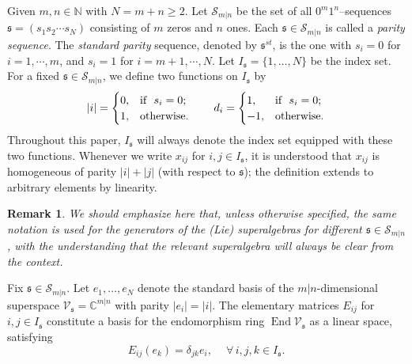 \documentclass[a4paper,12pt]{article}
\newtheorem{rema}[theo]{Remark}
\numberwithin{equation}{section}
\begin{document}
Given $m,n\in\mathbb{N}$ with $N=m+n\geqslant 2$. Let $\mathcal{S}_{m|n}$ be the set of all $0^{m}1^{n}$--sequences $\mathfrak{s}=(s_1s_2\cdots s_N)$ consisting of $m$ zeros and $n$ ones. Each $\mathfrak{s}\in\mathcal{S}_{m|n}$ is called a \textit{parity sequence}. The \textit{standard parity} sequence, denoted by $\mathfrak{s}^{st}$, is the one with $s_i=0$ for $i=1,\cdots,m$, and $s_i=1$ for $i=m+1,\cdots,N$.
Let $I_{\mathfrak{s}}=\{1,\ldots,N\}$ be the index set. For a fixed $\mathfrak{s}\in\mathcal{S}_{m|n}$, we define two functions on $I_{\mathfrak{s}}$ by
$$
 |i|=\begin{cases}
        0, &\text{if}~~s_i=0; \\
        1, &{\rm otherwise}.
    \end{cases}
    \qquad 
    d_i=\begin{cases}
        1, &\text{if}~~s_i=0; \\
        -1, &{\rm otherwise}.
    \end{cases}
$$
Throughout this paper, $I_{\mathfrak{s}}$ will always denote the index set equipped with these two functions. Whenever we write $x_{ij}$ for $i,j\in I_{\mathfrak{s}}$, it is understood that $x_{ij}$ is homogeneous of parity $|i|+|j|$ (with respect to $\mathfrak{s}$); the definition extends to arbitrary elements by linearity. 

\begin{rema}\label{conven-R}
We should emphasize here that, unless otherwise specified, the same notation is used for the generators of the (Lie) superalgebras for different $\mathfrak{s}\in\mathcal{S}_{m|n}$, with the understanding that the relevant superalgebra will always be clear from the context. 
\end{rema}

Fix $\mathfrak{s}\in\mathcal{S}_{m|n}$. Let $e_1,\ldots,e_N$ denote the standard basis of the $m|n$-dimensional superspace $\mathcal{V}_{\mathfrak{s}}=\mathbb{C}^{m|n}$ with parity $|e_{i}|=|i|$. The elementary matrices $E_{ij}$ for $i,j\in I_{\mathfrak{s}}$ constitute a basis for the endomorphism ring $\operatorname{End} \mathcal{V}_{\mathfrak{s}}$ as a linear space, satisfying 
$$
E_{ij}(e_{k})=\delta_{jk}e_{i},\quad~\forall\, i,j,k\in I_{\mathfrak{s}}.
$$ 
\end{document}
